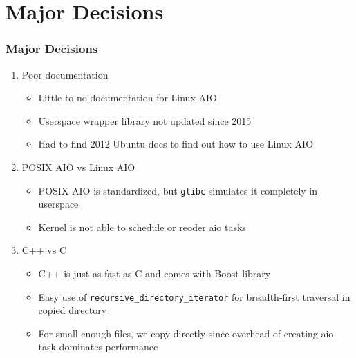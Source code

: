 \documentclass{beamer}
\begin{document}
\section{Major Decisions}
\begin{frame}
    \frametitle{Major Decisions}
    \begin{enumerate}[1.]
    	\item{Poor documentation}
    		\begin{itemize}
    			\item{Little to no documentation for Linux AIO}
    			\item{Userspace wrapper library not updated since 2015}
    			\item{Had to find 2012 Ubuntu docs to find out how to use Linux AIO~\cite{ubuntu}}
    		\end{itemize}
        \item{POSIX AIO vs Linux AIO }
            \begin{itemize}
                \item{POSIX AIO is standardized, but \texttt{glibc} simulates it
                        completely in userspace~\cite{aio7} }
                \item{Kernel is not able to schedule or reoder aio tasks }
            \end{itemize}
        \item{C++ vs C }
            \begin{itemize}
                \item{C++ is just as fast as C and comes with Boost library }
                \item{Easy use of \texttt{recursive\_directory\_iterator} for
                        breadth-first traversal in copied directory }
                \item{For small enough files, we copy directly since overhead of
                        creating aio task dominates performance }
            \end{itemize}
    \end{enumerate}
\end{frame}
\end{document}
